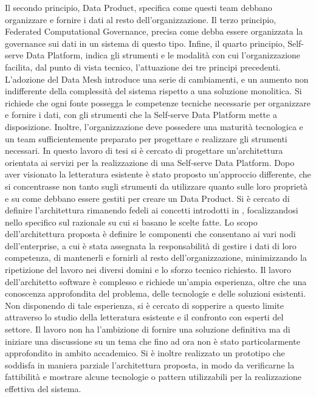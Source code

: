 \documentclass[12pt]{report}
\begin{document}
Il secondo principio, Data Product, specifica come questi team debbano organizzare e fornire i dati al resto dell'organizzazione.
Il terzo principio, Federated Computational Governance, precisa come debba essere organizzata la governance sui dati in un sistema di questo tipo.
Infine, il quarto principio, Self-serve Data Platform, indica gli strumenti e le modalità con cui l'organizzazione facilita, dal punto di vista tecnico, l'attuazione dei tre principi precedenti.
L'adozione del Data Mesh introduce una serie di cambiamenti, e un aumento non indifferente della complessità del sistema rispetto a una soluzione monolitica.
Si richiede che ogni fonte possegga le competenze tecniche necessarie per organizzare e fornire i dati, con gli strumenti che la Self-serve Data Platform mette a disposizione.
Inoltre, l'organizzazione deve possedere una maturità tecnologica e un team sufficientemente preparato per progettare e realizzare gli strumenti necessari.
In questo lavoro di tesi si è cercato di progettare un'architettura orientata ai servizi per la realizzazione di una Self-serve Data Platform.
Dopo aver visionato la letteratura esistente è stato proposto un'approccio differente, che si concentrasse non tanto sugli strumenti da utilizzare quanto sulle loro proprietà e su come debbano essere gestiti per creare un Data Product.
Si è cercato di definire l'architettura rimanendo fedeli ai concetti introdotti in \cite{perry_foundations_1992}, focalizzandosi nello specifico sul razionale su cui si basano le scelte fatte.
Lo scopo dell'architettura proposta è definire le componenti che consentano ai vari nodi dell'enterprise, a cui è stata assegnata la responsabilità di gestire i dati di loro competenza, di mantenerli e fornirli al resto dell'organizzazione, minimizzando la ripetizione del lavoro nei diversi domini e lo sforzo tecnico richiesto. 
Il lavoro dell'architetto software è complesso e richiede un'ampia esperienza, oltre che una conoscenza approfondita del problema, delle tecnologie e delle soluzioni esistenti.
Non disponendo di tale esperienza, si è cercato di sopperire a questo limite attraverso lo studio della letteratura esistente e il confronto con esperti del settore.
Il lavoro non ha l'ambizione di fornire una soluzione definitiva ma di iniziare una discussione su un tema che fino ad ora non è stato particolarmente approfondito in ambito accademico.
Si è inoltre realizzato un prototipo che soddisfa in maniera parziale l'architettura proposta, in modo da verificarne la fattibilità e mostrare alcune tecnologie o pattern utilizzabili per la realizzazione effettiva del sistema.
\end{document}

